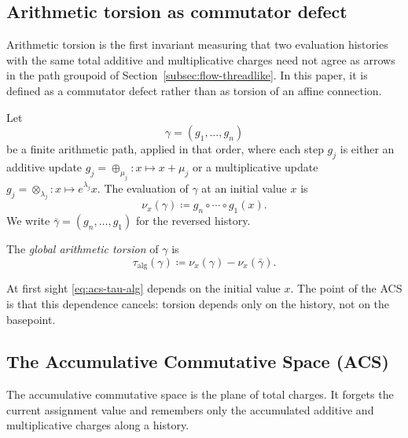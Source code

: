 
\subsection{Arithmetic torsion as commutator defect}\label{subsec:acs-torsion-def}

Arithmetic torsion is the first invariant measuring that two evaluation histories with the same total additive and multiplicative charges need not agree as arrows in the path groupoid of Section~\ref{subsec:flow-threadlike}. In this paper, it is defined as a commutator defect rather than as torsion of an affine connection.

Let
\[
\gamma=(g_1,\dots,g_n)
\]
be a finite arithmetic path, applied in that order, where each step $g_j$ is either an additive update $g_j=\oplus_{\mu_j}:x\mapsto x+\mu_j$ or a multiplicative update $g_j=\otimes_{\lambda_j}:x\mapsto e^{\lambda_j}x$. The evaluation of $\gamma$ at an initial value $x$ is
\[
\nu_x(\gamma)\coloneqq g_n\circ\cdots\circ g_1(x).
\]
We write $\bar\gamma=(g_n,\dots,g_1)$ for the reversed history.

\begin{definition}\label{def:acs-global-torsion}
The \emph{global arithmetic torsion} of $\gamma$ is
\begin{equation}\label{eq:acs-tau-alg}
\tau_{\mathrm{alg}}(\gamma)\coloneqq \nu_x(\gamma)-\nu_x(\bar\gamma).
\end{equation}
\end{definition}

At first sight \eqref{eq:acs-tau-alg} depends on the initial value $x$. The point of the ACS is that this dependence cancels: torsion depends only on the history, not on the basepoint.

\subsection{The Accumulative Commutative Space (ACS)}\label{subsec:acs-definition}

The accumulative commutative space is the plane of total charges. It forgets the current assignment value and remembers only the accumulated additive and multiplicative charges along a history.


